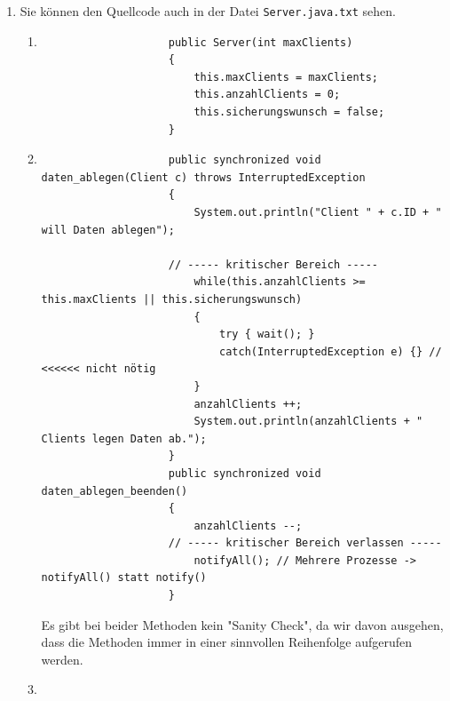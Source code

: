 \begin{enumerate}[label={Aufgabe H\arabic*},start=31]
    \item Sie können den Quellcode auch in der Datei \texttt{Server.java.txt} sehen.
        \begin{enumerate}
            \makeatletter
                \setlength{\leftmargins}{\@totalleftmargin}
            \makeatother

            \item \blanko
                \begin{verbatim}
                    public Server(int maxClients)
                    {
                        this.maxClients = maxClients;
                        this.anzahlClients = 0;
                        this.sicherungswunsch = false;
                    }
                \end{verbatim}
            \item \blanko 

                \begin{verbatim}
                    public synchronized void daten_ablegen(Client c) throws InterruptedException
                    {
                        System.out.println("Client " + c.ID + " will Daten ablegen");
                        
                    // ----- kritischer Bereich -----
                        while(this.anzahlClients >= this.maxClients || this.sicherungswunsch)
                        {
                            try { wait(); }
                            catch(InterruptedException e) {} // <<<<<< nicht nötig
                        }
                        anzahlClients ++; 
                        System.out.println(anzahlClients + " Clients legen Daten ab.");
                    }
                    public synchronized void daten_ablegen_beenden()
                    {
                        anzahlClients --;
                    // ----- kritischer Bereich verlassen -----
                        notifyAll(); // Mehrere Prozesse -> notifyAll() statt notify()
                    } 
                \end{verbatim}

                Es gibt bei beider Methoden kein "Sanity Check", da wir davon ausgehen, dass die Methoden immer in einer sinnvollen Reihenfolge aufgerufen werden.
            \item \blanko


\end{enumerate}
\end{enumerate}
